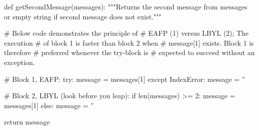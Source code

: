 \begin{python}[caption=The EAFP-principle., label=lst:permissionprinciple]
def getSecondMessage(messages):
  """Returns the second message from messages or
  empty string if second message does not exist."""
  
  # Below code demonstrates the principle of
  # EAFP (1) versus LBYL (2); The execution 
  # of block 1 is faster than block 2 when 
  # message[1] exists. Block 1 is therefore   
  # preferred whenever the try-block is 
  # expected to succeed without an exception.

  # Block 1, EAFP:
  try:
    message = messages[1]
  except IndexError:
    message = ''

  # Block 2, LBYL (look before you leap):
  if len(messages) >= 2:
    message = messages[1]
  else:
    message = ''
    
  return message
\end{python}